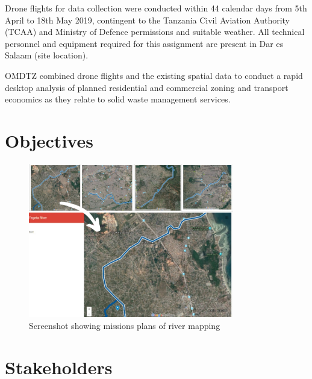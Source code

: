 \documentclass[a4paper,12pt,twoside]{article}
\begin{document}
Drone flights for data collection were conducted within 44 calendar days from 5th April to 18th May 2019, contingent  to the Tanzania Civil Aviation Authority (TCAA) and Ministry of Defence permissions and suitable weather. All technical personnel and equipment required for this assignment are present in Dar es Salaam (site location). 

OMDTZ  combined drone flights and the existing spatial data to conduct a rapid desktop analysis of planned residential and commercial zoning and transport economics as they relate to solid waste management services.

\newpage
\section{Objectives}

\lipsum[0-1]

\begin{figure}%
    \centering
    \includegraphics[width=0.8\textwidth]{images/image14.jpg}
    \caption{Screenshot showing missions plans of river mapping}
\end{figure}


\begin{multicols}{2}

\lipsum[0-5]

\end{multicols}

\section{Stakeholders}

\begin{multicols}{2}
\lipsum[0-5]
\end{multicols}
\end{document}
